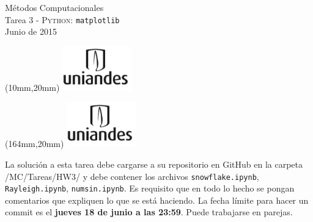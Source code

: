 \documentclass[11pt,letterpaper]{exam}
\begin{document}
\begin{center}
{\Large Métodos Computacionales} \\
Tarea 3 - \textsc{Python}: \verb+matplotlib+ \\
Junio de 2015
\end{center}

\begin{textblock*}{40mm}(10mm,20mm)
  \includegraphics[width=3cm]{logoUniandes.png}
\end{textblock*}

\begin{textblock*}{40mm}(164mm,20mm)
  \includegraphics[width=3cm]{logoUniandes.png}
\end{textblock*}

\vspace{0.5cm}

La solución a esta tarea debe cargarse a su repositorio en GitHub en la carpeta /MC/Tareas/HW3/ y debe contener los archivos \verb+snowflake.ipynb+, \verb+Rayleigh.ipynb+, \verb+numsin.ipynb+. Es requisito que en todo lo hecho se pongan comentarios que expliquen lo que se está haciendo. La fecha límite para hacer un commit es el \textbf{jueves 18 de junio a las 23:59}. Puede trabajarse en parejas.

\end{document}
